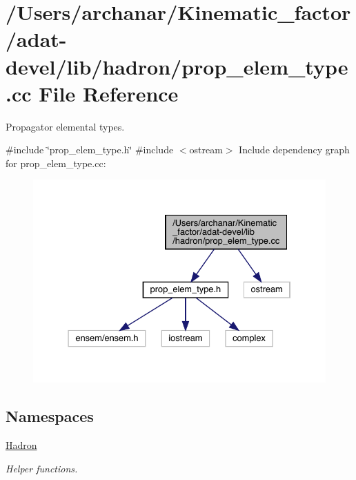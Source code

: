 \hypertarget{adat-devel_2lib_2hadron_2prop__elem__type_8cc}{}\section{/\+Users/archanar/\+Kinematic\+\_\+factor/adat-\/devel/lib/hadron/prop\+\_\+elem\+\_\+type.cc File Reference}
\label{adat-devel_2lib_2hadron_2prop__elem__type_8cc}


Propagator elemental types.  


{\ttfamily \#include \char`\"{}prop\+\_\+elem\+\_\+type.\+h\char`\"{}}\newline
{\ttfamily \#include $<$ostream$>$}\newline
Include dependency graph for prop\+\_\+elem\+\_\+type.\+cc\+:
\nopagebreak
\begin{figure}[H]
\begin{center}
\leavevmode
\includegraphics[width=331pt]{d9/d73/adat-devel_2lib_2hadron_2prop__elem__type_8cc__incl}
\end{center}
\end{figure}
\subsection*{Namespaces}
\begin{DoxyCompactItemize}
\item 
 \mbox{\hyperlink{namespaceHadron}{Hadron}}
\begin{DoxyCompactList}\small\item\em Helper functions. \end{DoxyCompactList}\end{DoxyCompactItemize}
